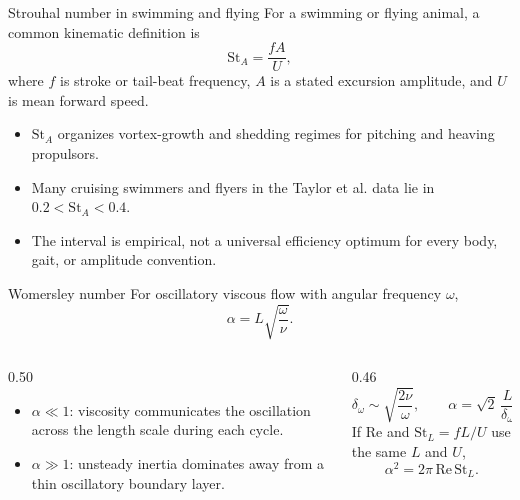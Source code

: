 \documentclass[aspectratio=169,11pt]{beamer}
\begin{document}
\begin{frame}{Strouhal number in swimming and flying}
For a swimming or flying animal, a common kinematic definition is
\[
  \boxed{\mathrm{St}_A=\frac{fA}{U}},
\]
where $f$ is stroke or tail-beat frequency, $A$ is a stated excursion amplitude, and $U$ is mean forward speed.
\begin{itemize}\itemsep6pt
  \item $\mathrm{St}_A$ organizes vortex-growth and shedding regimes for pitching and heaving propulsors.
  \item Many cruising swimmers and flyers in the Taylor et al. data lie in $0.2<\mathrm{St}_A<0.4$.
  \item The interval is empirical, not a universal efficiency optimum for every body, gait, or amplitude convention.
\end{itemize}
\end{frame}

\begin{frame}{Womersley number}
For oscillatory viscous flow with angular frequency $\omega$,
\[
  \boxed{\alpha=L\sqrt{\frac{\omega}{\nu}}}.
\]
\begin{columns}[T,onlytextwidth]
\begin{column}{0.50\textwidth}
\begin{itemize}\itemsep5pt
  \item $\alpha\ll1$: viscosity communicates the oscillation across the length scale during each cycle.
  \item $\alpha\gg1$: unsteady inertia dominates away from a thin oscillatory boundary layer.
\end{itemize}
\end{column}
\begin{column}{0.46\textwidth}
\[
  \delta_\omega\sim\sqrt{\frac{2\nu}{\omega}},
  \qquad
  \alpha=\sqrt{2}\,\frac{L}{\delta_\omega}.
\]
If $\mathrm{Re}$ and $\mathrm{St}_L=fL/U$ use the same $L$ and $U$,
\[
  \boxed{\alpha^2=2\pi\,\mathrm{Re}\,\mathrm{St}_L}.
\]
\end{column}
\end{columns}

\end{frame}
\end{document}
